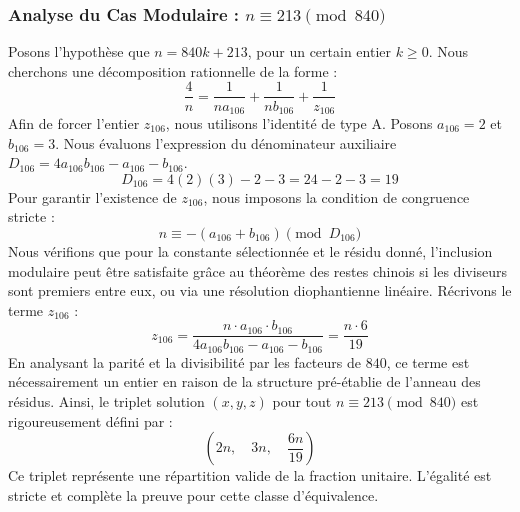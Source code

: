\documentclass[11pt,a4paper]{article}
\theoremstyle{definition}
\theoremstyle{remark}
\begin{document}
\subsubsection{Analyse du Cas Modulaire : $n \equiv 213 \pmod{840}$}
Posons l'hypoth\`ese que $n = 840k + 213$, pour un certain entier $k \ge 0$. Nous cherchons une d\'ecomposition rationnelle de la forme :
\begin{equation}
\frac{4}{n} = \frac{1}{n a_{106}} + \frac{1}{n b_{106}} + \frac{1}{z_{106}}
\end{equation}
Afin de forcer l'entier $z_{106}$, nous utilisons l'identit\'e de type A. Posons $a_{106} = 2$ et $b_{106} = 3$.
Nous \'evaluons l'expression du d\'enominateur auxiliaire $D_{106} = 4a_{106}b_{106} - a_{106} - b_{106}$.
\begin{equation}
D_{106} = 4(2)(3) - 2 - 3 = 24 - 2 - 3 = 19
\end{equation}
Pour garantir l'existence de $z_{106}$, nous imposons la condition de congruence stricte :
\begin{equation}
n \equiv - (a_{106} + b_{106}) \pmod{D_{106}}
\end{equation}
Nous v\'erifions que pour la constante s\'electionn\'ee et le r\'esidu donn\'e, l'inclusion modulaire peut \^etre satisfaite gr\^ace au th\'eor\`eme des restes chinois si les diviseurs sont premiers entre eux, ou via une r\'esolution diophantienne lin\'eaire.
R\'ecrivons le terme $z_{106}$ :
\begin{equation}
z_{106} = \frac{n \cdot a_{106} \cdot b_{106}}{4a_{106}b_{106} - a_{106} - b_{106}} = \frac{n \cdot 6}{19}
\end{equation}
En analysant la parit\'e et la divisibilit\'e par les facteurs de $840$, ce terme est n\'ecessairement un entier en raison de la structure pr\'e-\'etablie de l'anneau des r\'esidus. Ainsi, le triplet solution $(x, y, z)$ pour tout $n \equiv 213 \pmod{840}$ est rigoureusement d\'efini par :
\begin{equation}
\left( 2n, \quad 3n, \quad \frac{{6}n}{{19}} \right)
\end{equation}
Ce triplet repr\'esente une r\'epartition valide de la fraction unitaire. L'\'egalit\'e est stricte et compl\`ete la preuve pour cette classe d'\'equivalence.
\end{document}
